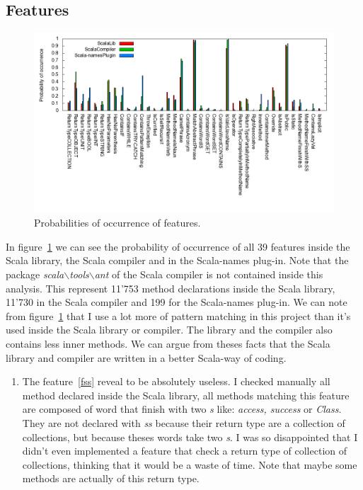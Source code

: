 \documentclass[12pt]{article}
\begin{document}
\subsection {Features}
\begin{figure}
\centering
\includegraphics[width=15cm]{images/percent.png}
\caption{Probabilities of occurrence of features.}
\label{fig:features}
\end{figure}
In figure~\ref{fig:features} we can see the probability of occurrence of all 39 features inside the Scala library, the Scala compiler and in the Scala-names plug-in. Note that the package \textit{scala$\backslash$tools$\backslash$ant} of the Scala compiler is not contained inside this analysis. This represent 11'753 method declarations inside the Scala library, 11'730 in the Scala compiler and 199 for the Scala-names plug-in. We can note from figure~\ref{fig:features} that I use a lot more of pattern matching in this project than it's used inside the Scala library or compiler. The library and the compiler also contains less inner methods. We can argue from theses facts that the Scala library and compiler are written in a better Scala-way of coding.
\begin{enumerate}
\item The feature~\ref{fss} reveal to be absolutely useless. I checked manually all method declared inside the Scala library, all methods matching this feature are composed of word that finish with two \textit{s} like: \textit{access, success} or \textit{Class}. They are not declared with \textit{ss} because their return type are a collection of collections, but because theses words take two \textit{s}. I was so disappointed that I didn't even implemented a feature that check a return type of collection of collections, thinking that it would be a waste of time. Note that maybe some methods are actually of this return type. 
\end{enumerate}
\end{document}
